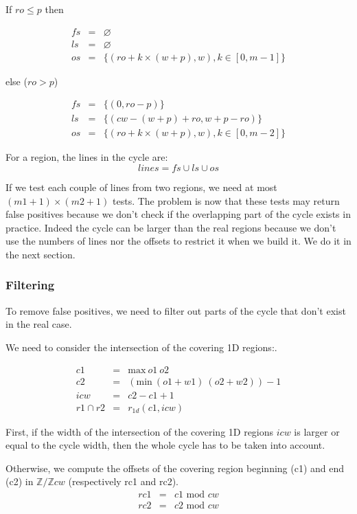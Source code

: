\documentclass[twocolumn]{article}
\begin{document}
\noindent If $ro \leq p$ then

\[
\begin{array}{rcl}
fs &=& \varnothing\\
ls &=& \varnothing\\
os &=& \{(ro+k\times (w+p), w), k \in [0,m-1]\}
\end{array}
\]

\noindent else ($ro > p$)

\[
\begin{array}{rcl}
fs &=& \{(0, ro-p)\}\\
ls &=& \{(cw-(w+p)+ro, w+p-ro)\}\\
os &=& \{(ro+k\times (w+p), w), k \in [0,m-2]\}
\end{array}
\]

For a region, the lines in the cycle are:
\[ lines = fs \cup ls \cup os \]

If we test each couple of lines from two regions, we need at most $(m1+1) \times
(m2+1)$ tests. The problem is now that these tests may return false positives
because we don't check if the overlapping part of the cycle exists in practice.
Indeed the cycle can be larger than the real regions because we don't use the
numbers of lines nor the offsets to restrict it when we build it. We do it in
the next section.

\subsubsection{Filtering}

To remove false positives, we need to filter out parts of the cycle that don't
exist in the real case.

We need to consider the intersection of the covering 1D regions:.

\[
\begin{array}{rcl}
c1               &=& \textrm{max}\ o1\ o2 \\
c2               &=& (\textrm{min}\ (o1+w1)\ (o2+w2)) - 1\\
icw              &=& c2 - c1 + 1\\
r1 \cap r2       &=& r_{1d}(c1, icw)
\end{array}
\]

First, if the width of the intersection of the covering 1D regions $icw$
is larger or equal to the cycle width, then the whole cycle has to be
taken into account.

Otherwise, we compute the offsets of the covering region beginning (c1) and end
(c2) in $\mathbb{Z}/\mathbb{Z}cw$ (respectively rc1 and rc2).
\[
\begin{array}{rcl}
rc1 &=& c1 \textrm{ mod } cw \\
rc2 &=& c2 \textrm{ mod } cw
\end{array}
\]
\end{document}
